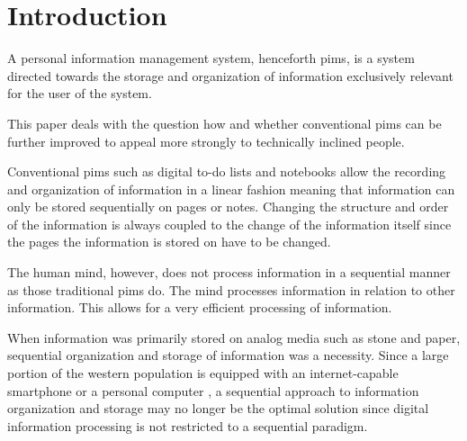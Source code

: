 \section{Introduction}

A personal information management system, henceforth \gls{pims}, is a system
directed towards the storage and organization of information exclusively
relevant for the user of the system.

This paper deals with the question how and whether conventional \gls{pims}
can be further improved to appeal more strongly to technically inclined
people.

Conventional \gls{pims} such as digital to-do lists and notebooks allow the
recording and organization of information in a linear fashion meaning that
information can only be stored sequentially on pages or notes. Changing the
structure and order of the information is always coupled to the change of the
information itself since the pages the information is stored on have to be
changed.

The human mind, however, does not process information in a sequential manner
as those traditional \gls{pims} do. \cite{Sowa:1984:CSI:4569} The mind
processes information in relation to other information. This allows for a very
efficient processing of information.

When information was primarily stored on analog media such as stone and paper,
sequential organization and storage of information was a necessity. Since a
large portion of the western population is equipped with an internet-capable
smartphone or a personal computer \cite{rainie2010internet}, a sequential
approach to information organization and storage may no longer be the optimal
solution since digital information processing is not restricted to a sequential
paradigm.

\iffalse
0 problem
1st problem
2nd introduction / storyline why not optimal
3rd criteria of possible solution
4rd proposition
5 conclusion / why system more optimal / research question
\fi
